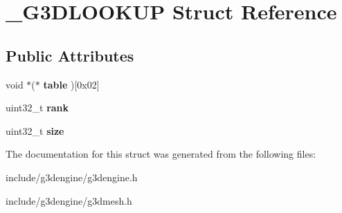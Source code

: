 \hypertarget{struct__G3DLOOKUP}{}\section{\+\_\+\+G3\+D\+L\+O\+O\+K\+UP Struct Reference}
\label{struct__G3DLOOKUP}
\subsection*{Public Attributes}
\begin{DoxyCompactItemize}
\item 
\mbox{\label{struct__G3DLOOKUP_a53b8b372b4f261acc63d3f6c10abecd5}} 
void $\ast$($\ast$ {\bfseries table} )\mbox{[}0x02\mbox{]}
\item 
\mbox{\label{struct__G3DLOOKUP_a34a0a1b3b63b81bf0687f2747e3c8da3}} 
uint32\+\_\+t {\bfseries rank}
\item 
\mbox{\label{struct__G3DLOOKUP_a326281cfba10ac9f05b5e8b977ba3a0a}} 
uint32\+\_\+t {\bfseries size}
\end{DoxyCompactItemize}


The documentation for this struct was generated from the following files\+:\begin{DoxyCompactItemize}
\item 
include/g3dengine/g3dengine.\+h\item 
include/g3dengine/g3dmesh.\+h\end{DoxyCompactItemize}
